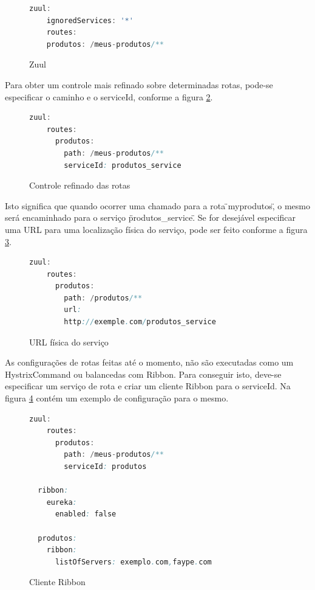 \documentclass[journal]{IEEEtran}
\begin{document}
\begin{figure}[h]
\centering

\begin{lstlisting}[language=Java]
  zuul:
    ignoredServices: '*'
    routes:
    produtos: /meus-produtos/**
\end{lstlisting}

\caption{Zuul}
\label{alg:figuradezesseis}
\end{figure}

Para obter um controle mais refinado sobre determinadas rotas, pode-se especificar o caminho e o serviceId, conforme a figura \ref{alg:figuradezessete}.

\begin{figure}[h]
\centering

\begin{lstlisting}[language=Java]
  zuul:
    routes:
      produtos:
        path: /meus-produtos/**
        serviceId: produtos_service
\end{lstlisting}

\caption{Controle refinado das rotas}
\label{alg:figuradezessete}
\end{figure}

Isto significa que quando ocorrer uma chamado para a rota \"\/myprodutos\", o mesmo será encaminhado para o serviço \"produtos\_service\". Se for desejável especificar uma URL para uma localização física do serviço, pode ser feito conforme a figura \ref{alg:figuradezoito}.

\begin{figure}[h]
\centering

\begin{lstlisting}[language=Java]
  zuul:
    routes:
      produtos:
        path: /produtos/**
        url: 
        http://exemple.com/produtos_service
\end{lstlisting}

\caption{URL física do serviço}
\label{alg:figuradezoito}
\end{figure}

As configurações de rotas feitas até o momento, não são executadas como um HystrixCommand ou balancedas com Ribbon. Para conseguir isto, deve-se especificar um serviço de rota e criar um cliente Ribbon para o serviceId. Na figura \ref{alg:figuravinte} contém um exemplo de configuração para o mesmo.

\begin{figure}[h]
\centering

\begin{lstlisting}[language=Java]
  zuul:
    routes:
      produtos:
        path: /meus-produtos/**
        serviceId: produtos

  ribbon:
    eureka:
      enabled: false

  produtos:
    ribbon:
      listOfServers: exemplo.com,faype.com
\end{lstlisting}

\caption{Cliente Ribbon}
\label{alg:figuravinte}
\end{figure}
\end{document}
